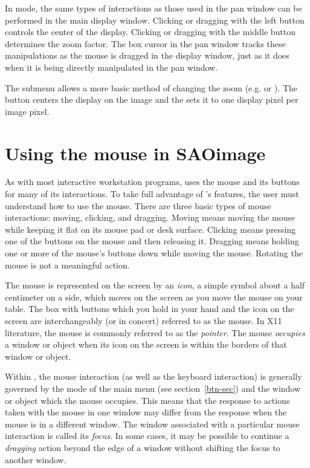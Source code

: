 In  mode, the same types of interactions as those used in
the pan window can be performed in the main display window.
Clicking or dragging with the left button controls the center
of the display.  Clicking or dragging with the middle button
determines the zoom factor.  The box cursor in the pan window
tracks these manipulations as the mouse is dragged in the
display window, just as it does when it is being directly
manipulated in the pan window.

The  submenu allows a more basic method of changing the
zoom (e.g.  or ).  The  button centers the
display on the image and the  sets it to one display pixel per
image pixel.

\section{ Using the mouse in SAOimage } \label{mouse-sec}

As with most interactive workstation programs, {\SAO} uses the mouse
and its buttons for many of its interactions.  To take full advantage of
{\SAO}'s features, the user must understand how to use the mouse.
There are three basic types of mouse interactions: moving, clicking, and
dragging.  Moving means moving the mouse while keeping it flat on its
mouse pad or desk surface.  Clicking means pressing one of the buttons
on the mouse and then releasing it.  Dragging means holding one or more
of the mouse's buttons down while moving the mouse.  Rotating the mouse
is not a meaningful action.

The mouse is represented on the screen by an {\em icon}, a simple symbol
about a half centimeter on a side, which moves on the screen as you move
the mouse on your table.  The box with buttons which you hold in your
hand and the icon on the screen are interchangeably (or in concert)
referred to as the mouse.  In X11 literature, the mouse is commonly
referred to as the {\em pointer}.  The mouse {\em occupies} a window or object
when its icon on the screen is within the borders of that window or
object.

Within {\SAO}, the mouse interaction (as well as the keyboard interaction)
is generally governed by the mode of the main menu (see section~\ref{btn-sec}) and
the window or object which the mouse occupies.  This means that the response
to actions taken with the mouse in one window may differ from the response
when the mouse is in a different window.  The window associated with a
particular mouse interaction is called its {\em focus}.  In some cases,
it may be possible to continue a {\em dragging} action beyond the edge of a
window without shifting the focus to another window.

